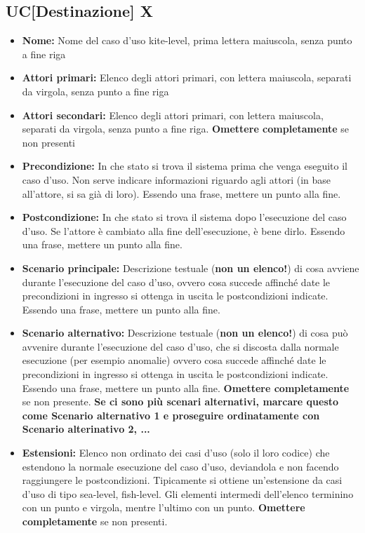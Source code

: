 \documentclass[a4paper, oneside]{article} %
\begin{document}
\subsection*{UC[Destinazione] X}
\begin{itemize}
\item \textbf{Nome:} Nome del caso d'uso kite-level, prima lettera maiuscola, senza punto a fine riga
\item \textbf{Attori primari:} Elenco degli attori primari, con lettera maiuscola, separati da virgola, senza punto a fine riga
\item \textbf{Attori secondari:} Elenco degli attori primari, con lettera maiuscola, separati da virgola, senza punto a fine riga. \textbf{Omettere completamente} se non presenti
\item \textbf{Precondizione:} In che stato si trova il sistema prima che venga eseguito il caso d'uso. Non serve indicare informazioni riguardo agli attori (in base all'attore, si sa già di loro). Essendo una frase, mettere un punto alla fine.
\item \textbf{Postcondizione:} In che stato si trova il sistema dopo l'esecuzione del caso d'uso. Se l'attore è cambiato alla fine dell'esecuzione, è bene dirlo. Essendo una frase, mettere un punto alla fine.
\item \textbf{Scenario principale:} Descrizione testuale (\textbf{non un elenco!}) di cosa avviene durante l'esecuzione del caso d'uso, ovvero cosa succede affinché date le precondizioni in ingresso si ottenga in uscita le postcondizioni indicate. Essendo una frase, mettere un punto alla fine.
\item \textbf{Scenario alternativo:} Descrizione testuale (\textbf{non un elenco!}) di cosa può avvenire durante l'esecuzione del caso d'uso, che si discosta dalla normale esecuzione (per esempio anomalie) ovvero cosa succede affinché date le precondizioni in ingresso si ottenga in uscita le postcondizioni indicate. Essendo una frase, mettere un punto alla fine. \textbf{Omettere completamente} se non presente. \textbf{Se ci sono più scenari alternativi, marcare questo come Scenario alternativo 1 e proseguire ordinatamente con Scenario alterinativo 2, ...}
\item \textbf{Estensioni:} Elenco non ordinato dei casi d'uso (solo il loro codice) che estendono la normale esecuzione del caso d'uso, deviandola e non facendo raggiungere le postcondizioni. Tipicamente si ottiene un'estensione da casi d'uso di tipo sea-level, fish-level. Gli elementi intermedi dell'elenco terminino con un punto e virgola, mentre l'ultimo con un punto. \textbf{Omettere completamente} se non presenti.

\end{itemize}
\end{document}
